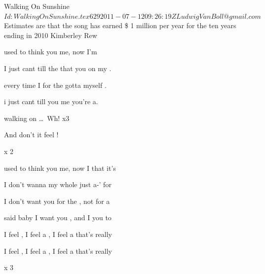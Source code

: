 \begin{SBSong}{Walking On Sunshine}
  {$Id: WalkingOnSunshine.tex 629 2011-07-12 09:26:19Z LudwigVanBoll@gmail.com $}
  {Estimates are that the song has earned \$ 1 million per year for the ten years ending in 2010}
  {Kimberley Rew}
  \begin{SBVerse}
	 used to think  you  me, now  I'm    

	 I just cant  till the  that you  on my .   

	 every time I  for the  gotta  myself .   

	 i just cant  till you  me you're  a.   
  \end{SBVerse}
  \begin{SBChorus}
	 walking on \ldots\ Wh! x3

	And don't it feel !   

	    x 2
  \end{SBChorus}
  \begin{SBVerse}
	 used to think  you  me, now I  that it's    

	 I don't wanna  my whole  just a-' for    

	 I don't want you  for the , not  for a    

	 said baby I  want you , and I  you to    
  \end{SBVerse}
  \begin{SBVerse}
	I feel , I feel a , I feel a  that's really 

	I feel , I feel a , I feel a  that's really 

	    x 3
  \end{SBVerse}
\end{SBSong}